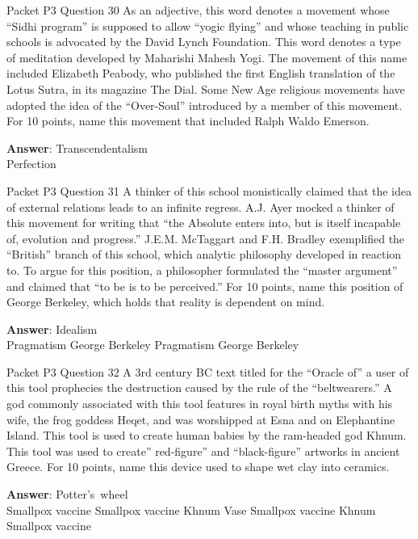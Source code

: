 \begin{frame}{Packet P3 Question 30}
As an adjective, this   word denotes a movement whose “Sidhi program” is supposed to allow “yogic flying” and whose teaching in public schools is advocated by the David Lynch Foundation. This word denotes a type of meditation developed by Maharishi Mahesh Yogi. The movement of this name included Elizabeth Peabody, who published     the first English translation of the Lotus Sutra, in its magazine The Dial. Some New Age religious movements have adopted the idea of the “Over-Soul” introduced by a member of this movement. For 10 points, name this movement that included   Ralph Waldo Emerson.  

\textbf{Answer}: Transcendentalism\\
 Perfection
\end{frame}

\begin{frame}{Packet P3 Question 31}
A thinker of this school monistically claimed that the idea of external relations leads to an infinite regress. A.J. Ayer mocked a thinker of this movement for writing that “the Absolute   enters into, but is itself incapable of, evolution and progress.” J.E.M. McTaggart and F.H. Bradley exemplified the “British” branch of this school, which analytic philosophy developed in reaction to. To argue for this position, a philosopher formulated the “master argument” and claimed that “to be is to be perceived.” For 10 points, name this position of George Berkeley,   which holds that reality is dependent on mind.      

\textbf{Answer}: Idealism\\
 Pragmatism
 George Berkeley
 Pragmatism
 George Berkeley
\end{frame}

\begin{frame}{Packet P3 Question 32}
A 3rd century BC text titled for the “Oracle of” a user of this tool prophecies the   destruction caused by the rule of the “beltwearers.” A god commonly associated with this tool features   in royal birth myths with his wife, the frog goddess Heqet, and was worshipped at Esna and on Elephantine Island. This   tool is used to create human babies by the ram-headed god Khnum. This tool was used to create” red-figure” and “black-figure” artworks in ancient Greece. For 10 points, name this device used to shape wet clay into ceramics.        

\textbf{Answer}: Potter's\ wheel\\
 Smallpox vaccine
 Smallpox vaccine
 Khnum
 Vase
 Smallpox vaccine
 Khnum
 Smallpox vaccine
\end{frame}


